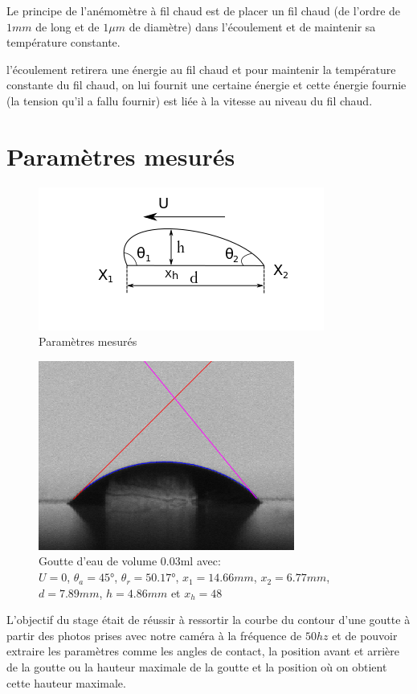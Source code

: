 Le principe de l'anémomètre à fil chaud est de placer un fil chaud (de l'ordre de $1mm$ de long et de $1\mu m$ de diamètre) dans l'écoulement et de maintenir sa température constante.

l'écoulement retirera une énergie au fil chaud et pour maintenir la température constante du fil chaud, on lui fournit une certaine énergie et cette énergie fournie (la tension qu'il a fallu fournir) est liée à la vitesse au niveau du fil chaud.


\section{Paramètres mesurés}

\begin{figure}[!ht]
	\centering
	\includegraphics[scale = 1]{./image/rrgou2.png}
	\caption{Paramètres mesurés}
\end{figure}
\begin{figure}[!ht]
	\centering
	\includegraphics[scale = 0.5]{./image/crop_tvitesse=28_volume=003.png}
	\caption{Goutte d'eau de volume $0.03$ml avec: \\$U = 0$, $\theta_{a} = \ang{45}$, $\theta_{r} = \ang{50.17}$, $x_{1} = 14.66mm$, $x_{2} = 6.77mm$,\\ $d = 7.89mm$, $h = 4.86mm$ et $x_{h} = 48$}
\end{figure}


L'objectif du stage était de réussir à ressortir la courbe du contour d'une goutte à partir des photos prises avec notre caméra à la fréquence de $50hz$ et de pouvoir extraire les paramètres comme les angles de contact, la position avant et arrière de la goutte ou la hauteur maximale de la goutte et la position où on obtient cette hauteur maximale.

